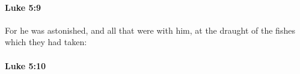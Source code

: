 		\paragraph{Luke 5:9} %
			\label{LUKE-5-9}

			For he was astonished, and all that were with him, at the draught of the fishes which they had taken:

			\begin{framed}
			\scriptsize
				\begin{compactdesc}
					\item[SBLG] 
				\end{compactdesc}
			\end{framed}

		\paragraph{Luke 5:10} %
			\label{LUKE-5-10}

